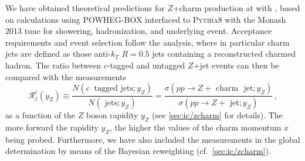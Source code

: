 We have obtained  theoretical predictions for $Z$+charm production
at \lhcb with , based on
\nlo \qcd calculations using
\textsc{\small POWHEG-BOX} 
interfaced to \textsc{\small Pythia8}
with the Monash 2013 tune for showering,
hadronization, and underlying event.
%
Acceptance requirements and event selection follow the \lhcb analysis,
where in particular charm jets are defined as those anti-$k_T$ $R=0.5$ jets
containing a reconstructed charmed hadron.
%
The ratio between $c$-tagged and untagged $Z$+jet events can then
be compared with the \lhcb measurements
\begin{equation}
  \mathcal{R}_j^c(y_Z) \equiv \frac{N(c~\textrm{ tagged~jets};y_Z)}{ 
    N(\textrm{ jets};y_Z)} =
  \frac{\sigma(pp\to Z+\textrm{ charm~ jet};y_Z)}{\sigma(pp \to Z+\textrm{ jet};y_Z)} \, ,
\end{equation}
as a function of the $Z$ boson rapidity $y_Z$ (see \cref{sec:ic/zcharm} for details).
%
The more forward the rapidity $y_{Z}$, the higher the values of the charm
momentum $x$ being probed.
%
Furthermore, we have also included the \lhcb measurements in the global \pdf
determination by means of the Bayesian reweighting (cf.\ \cref{sec:ic/zcharm}).
